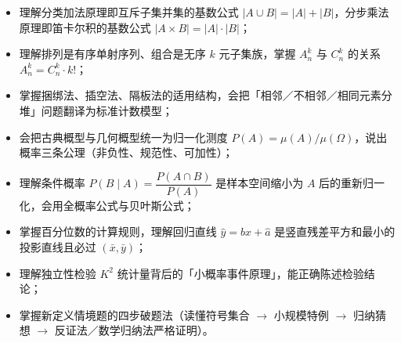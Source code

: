 \begin{learnobjective}
\begin{itemize}
  \item 理解分类加法原理即互斥子集并集的基数公式 $|A\cup B|=|A|+|B|$，分步乘法原理即笛卡尔积的基数公式 $|A\times B|=|A|\cdot|B|$；
  \item 理解排列是有序单射序列、组合是无序 $k$ 元子集族，掌握 $A_n^k$ 与 $C_n^k$ 的关系 $A_n^k=C_n^k\cdot k!$；
  \item 掌握捆绑法、插空法、隔板法的适用结构，会把「相邻／不相邻／相同元素分堆」问题翻译为标准计数模型；
  \item 会把古典概型与几何概型统一为归一化测度 $P(A)=\mu(A)/\mu(\Omega)$，说出概率三条公理（非负性、规范性、可加性）；
  \item 理解条件概率 $P(B\mid A)=\dfrac{P(A\cap B)}{P(A)}$ 是样本空间缩小为 $A$ 后的重新归一化，会用全概率公式与贝叶斯公式；
  \item 掌握百分位数的计算规则，理解回归直线 $\hat y=\hat bx+\hat a$ 是竖直残差平方和最小的投影直线且必过 $(\bar x,\bar y)$；
  \item 理解独立性检验 $K^2$ 统计量背后的「小概率事件原理」，能正确陈述检验结论；
  \item 掌握新定义情境题的四步破题法（读懂符号集合 $\to$ 小规模特例 $\to$ 归纳猜想 $\to$ 反证法／数学归纳法严格证明）。
\end{itemize}
\end{learnobjective}

